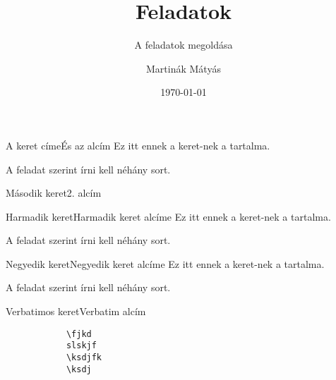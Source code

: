 \documentclass[aspectratio=169, bigger, xcolor={table}]{beamer}
\author{Martinák Mátyás}
\title{Feladatok}
\subtitle{A feladatok megoldása}
\institute{Miskolci Egyetem}
\date{\today}
\begin{document}
	\maketitle
	
	\begin{frame}{A keret címe}{És az alcím}
		Ez itt ennek a keret-nek a tartalma.
		
		A feladat szerint írni kell néhány sort.
	\end{frame}
	
	\begin{frame}[allowframebreaks]{Második keret}{2. alcím}
		\hulipsum
	\end{frame}
	
	\begin{frame}{Harmadik keret}{Harmadik keret alcíme}
		Ez itt ennek a keret-nek a tartalma.
		
		A feladat szerint írni kell néhány sort.
	\end{frame}
	
	\begin{frame}{Negyedik keret}{Negyedik keret alcíme}
		Ez itt ennek a keret-nek a tartalma.
		
		A feladat szerint írni kell néhány sort.
	\end{frame}
	
	\begin{frame}[fragile]{Verbatimos keret}{Verbatim alcím}
		
		\begin{verbatim}
			\fjkd
			slskjf
			\ksdjfk
			\ksdj
		\end{verbatim}
		
	\end{frame}
	
\end{document}
